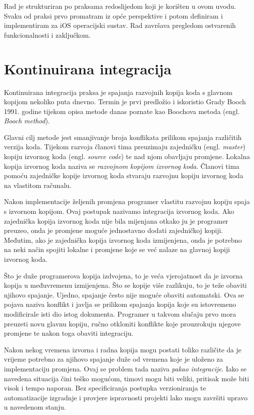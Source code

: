 \documentclass[times, utf8, diplomski, numeric]{fer}
\newcommand{\eng}[1]{(engl. \textit{#1})}
\begin{document}
Rad je strukturiran po praksama redoslijedom koji je korišten u ovom uvodu. Svaku od praksi prvo promatram iz opće perspektive i potom definiram i implementiram za iOS operacijski sustav. Rad završava pregledom ostvarenih funkcionalnosti i zaključkom.


\chapter{Kontinuirana integracija} \label{header:Kontinuirana_Integracija}

Kontinuirana integracija praksa je spajanja razvojnih kopija koda s glavnom kopijom nekoliko puta dnevno. Termin je prvi predložio i iskoristio Grady Booch 1991. godine tijekom opisa metode danas poznate kao Boochova metoda \eng{Booch method}\citep{wiki:BoochMethod}.

Glavni cilj metode jest smanjivanje broja konflikata prilikom spajanja različitih verzija koda. Tijekom razvoja članovi tima preuzimaju zajedničku \eng{master} kopiju izvornog koda \eng{source code} te nad njom obavljaju promjene. Lokalna kopija izvornog koda naziva se \textit{razvojnom kopijom izvornog koda}. Članovi tima pomoću zajedničke kopije izvornog koda stvaraju razvojnu kopiju izvornog koda na vlastitom računalu.

Nakon implementacije željenih promjena programer vlastitu razvojnu kopiju spaja s izvornom kopijom. Ovaj postupak nazivamo integracija izvornog koda. Ako zajednička kopija izvornog koda nije bila mijenjana otkako ju je programer preuzeo, onda je promjene moguće jednostavno dodati zajedničkoj kopiji. Međutim, ako je zajednička kopija izvornog koda izmijenjena, onda je potrebno na neki način spojiti lokalne i promjene koje se već nalaze na glavnoj kopiji izvornog koda.

Što je duže programerova kopija izdvojena, to je veća vjerojatnost da je izvorna kopija u međuvremenu izmijenjena. Što se kopije više razlikuju, to je teže obaviti njihovo spajanje. Ujedno, spajanje često nije moguće obaviti automatski. Ova se pojava naziva konflikt i javlja se prilikom spajanja kopija koje su istovremeno modificirale isti dio istog dokumenta. Programer u takvom slučaju prvo mora preuzeti novu glavnu kopiju, ručno otkloniti konflikte koje prouzrokuju njegove promjene te nakon toga obaviti integraciju.

Nakon nekog vremena izvorna i radna kopija mogu postati toliko različite da je vrijeme potrebno za njihovo spajanje duže od vremena koje je uloženo za implementaciju promjena. Ovaj se problem tada naziva \textit{pakao integracije}. Iako se navedena situacija čini teško mogućom, timovi mogu biti veliki, pritisak može biti visok i tempo naporan. Bez specificiranja postupka verzioniranja te automatizacije izgradnje i provjere ispravnosti projekti lako mogu završiti upravo u navedenom stanju.
\end{document}
